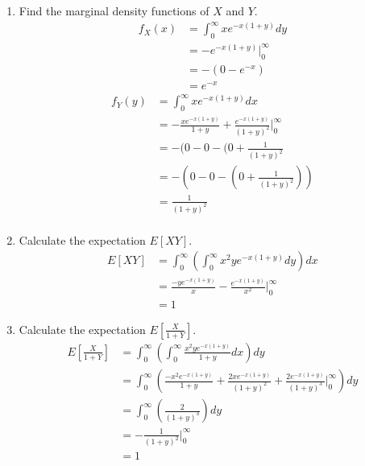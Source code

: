 \documentclass[10pt]{article}
\begin{document}
\begin{itemize}
	\begin{enumerate}
		\item  Find the marginal density functions of $X$ and $Y$.
			\begin{align*}
				f_X(x) &= \int_{{0}}^{{\infty}} {xe^{-x(1+y)}} d{y} \\
					&= -e^{-x(1+y)}|_0^{\infty} \\
					&= -(0 - e^{-x} )\\
					&= e^{-x}
			\end{align*}
			\begin{align*}
				f_Y(y) &= \int_{{0}}^{{\infty}} {xe^{-x(1+y)}} d{x} \\
					   &= -\frac{xe^{-x(1+y)}}{1+y} + \frac{e^{-x(1+y)}}{(1+y)^2} |_0^{\infty} \\
					&= -(0 - 0 - (0 + \frac{1}{(1+y)^2}  \\
					&= -\left(0 - 0 - \left(0 + \frac{1}{(1+y)^2}\right) \right) \\
					&= \frac{1}{(1+y)^2}  \\
			\end{align*}

		\item  Calculate the expectation $E[X Y]$.
			\begin{align*}
				E[XY] &= \int_{0}^{\infty} \left( \int_{0}^{\infty} x^2ye^{-x(1+y)} d{y} \right) d{x} \\
					  &= \frac{-ye^{-x(1+y)}}{x} - \frac{e^{-x(1+y)}}{x^2} |_0^{\infty} \\
					  &= 1
			\end{align*}

		\item  Calculate the expectation $E\left[\frac{X}{1+Y}\right]$.
			\begin{align*}
				E\left[\frac{X}{1+Y}\right] &= \int_{0}^{\infty} \left( \int_{0}^{\infty} \frac{x^2ye^{-x(1+y)}}{1+y} d{x} \right) d{y} \\
				&= \int_0^{\infty} \left(
				\frac{-x^2e^{-x(1+y)}}{1+y}
			+ \frac{2xe^{-x(1+y)}}{(1+y)^2}
			+ \frac{2e^{-x(1+y)}}{(1+y)^3}
			|_0^{\infty}
		\right) dy\\
			&= \int_0^{\infty}
			\left( 
			\frac{2}{(1+y)^3}
			\right) dy\\
			&= 
			- \frac{1}{ (1+y)^2}
			|_0^{\infty} \\
			&= 1
			\end{align*}

			
	\end{enumerate}


\end{itemize}
\end{document}
